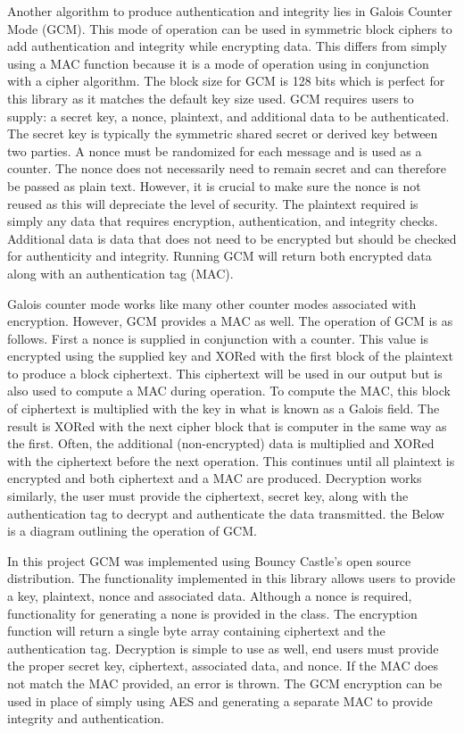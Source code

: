 Another algorithm to produce authentication and integrity lies in Galois Counter Mode (GCM). This mode of operation can be used in symmetric block ciphers to add authentication and integrity while encrypting data. This differs from simply using a MAC function because it is a mode of operation using in conjunction with a cipher algorithm. The block size for GCM is 128 bits which is perfect for this library as it matches the default key size used. GCM requires users to supply: a secret key, a nonce, plaintext, and additional data to be authenticated. The secret key is typically the symmetric shared secret or derived key between two parties. A nonce must be randomized for each message and is used as a counter. The nonce does not necessarily need to remain secret and can therefore be passed as plain text. However, it is crucial to make sure the nonce is not reused as this will depreciate the level of security. The plaintext required is simply any data that requires encryption, authentication, and integrity checks. Additional data is data that does not need to be encrypted but should be checked for authenticity and integrity. Running GCM will return both encrypted data along with an authentication tag (MAC). 

Galois counter mode works like many other counter modes associated with encryption. However, GCM provides a MAC as well. The operation of GCM is as follows. First a nonce is supplied in conjunction with a counter. This value is encrypted using the supplied key and XORed with the first block of the plaintext to produce a block ciphertext. This ciphertext will be used in our output but is also used to compute a MAC during operation. To compute the MAC, this block of ciphertext is multiplied with the key in what is known as a Galois field. The result is XORed with the next cipher block that is computer in the same way as the first. Often, the additional (non-encrypted) data is multiplied and XORed with the ciphertext before the next operation. This continues until all plaintext is encrypted and both ciphertext and a MAC are produced.  Decryption works similarly, the user must provide the ciphertext, secret key,  along with the authentication tag to decrypt and authenticate the data transmitted. the Below is a diagram outlining the operation of GCM. 

In this project GCM was implemented using Bouncy Castle's open source distribution. The functionality implemented in this library allows users to provide a key, plaintext, nonce and associated data. Although a nonce is required, functionality for generating a none is provided in the class. The encryption function will return a single byte array containing ciphertext and the authentication tag. Decryption is simple to use as well, end users must provide the proper secret key, ciphertext, associated data, and nonce. If the MAC does not match the MAC provided, an error is thrown. The GCM encryption can be used in place of  simply using AES and generating a separate MAC to provide integrity and authentication. 

